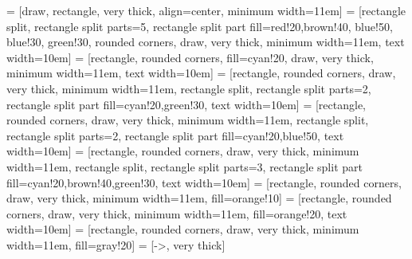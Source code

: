 \def\nnboxminwidth{11em}
\def\nnboxtextwidth{10em}

\def\densecolor{cyan!20}
\def\dropoutcolor{green!30}
\def\maxpoolingcolor{blue!30}
\def\cnncolor{red!20}
\def\bncolor{brown!40}
\def\actcolor{blue!50}
\def\classifiercolor{gray!20}
\def\fxcolor{purple!40}
\def\combocolor{orange!40}
\def\glasgowcolor{lime!80}
\def\subtractcolor{orange!10}
\def\pcacolor{orange!20}
\def\resnetcolor{yellow!40}

\newcommand{\indexecgtext}{\textbf{Index ECG}\\12 leads, 10 seconds}
\newcommand{\priorecgtext}{\textbf{Prior ECG}\\12 leads, 10 seconds}
\newcommand{\clinicaltext}{\textbf{Additional clinical variables}\\Age, sex, hs-cTnT, $\Delta$t}
\newcommand{\glasgowtext}{\textbf{Glasgow Algorithm}\\228 features}
\newcommand{\predictiontext}{\textbf{Prediction}\\MACE within 30 days}
\newcommand{\difftext}{\textbf{Subtract}}
\newcommand{\resnettext}{\textbf{Residual Network}\\5120 features}

\def\concatsize{3pt}

 = [draw, rectangle, very thick, align=center, minimum width=\nnboxminwidth]
 = [rectangle split, rectangle split parts=5, rectangle split part fill={\cnncolor,\bncolor, \actcolor, \maxpoolingcolor, \dropoutcolor}, rounded corners, draw, very thick, minimum width=\nnboxminwidth, text width=\nnboxtextwidth]
 = [rectangle, rounded corners, fill=\densecolor, draw, very thick,  minimum width=\nnboxminwidth, text width=\nnboxtextwidth]
 = [rectangle, rounded corners, draw, very thick, minimum width=\nnboxminwidth, rectangle split, rectangle split parts=2, rectangle split part fill={\densecolor,\dropoutcolor}, text width=\nnboxtextwidth]
 = [rectangle, rounded corners, draw, very thick, minimum width=\nnboxminwidth, rectangle split, rectangle split parts=2, rectangle split part fill={\densecolor,\actcolor}, text width=\nnboxtextwidth]
 = [rectangle, rounded corners, draw, very thick, minimum width=\nnboxminwidth, rectangle split, rectangle split parts=3, rectangle split part fill={\densecolor,\bncolor,\dropoutcolor}, text width=\nnboxtextwidth]
 = [rectangle, rounded corners, draw, very thick, minimum width=\nnboxminwidth, fill=\subtractcolor]
 = [rectangle, rounded corners, draw, very thick, minimum width=\nnboxminwidth, fill=\pcacolor, text width=\nnboxtextwidth]
 = [rectangle, rounded corners, draw, very thick, minimum width=\nnboxminwidth, fill=\classifiercolor]
 = [->, very thick]

